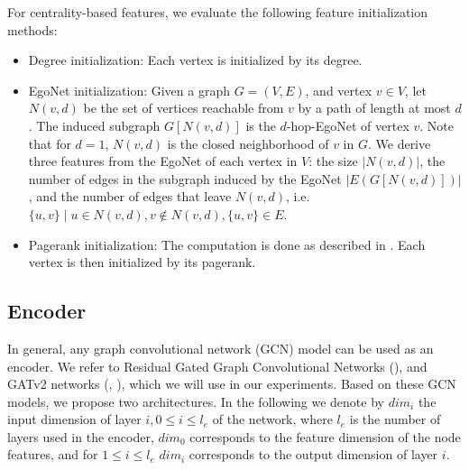 \documentclass[draft,final]{vutinfth} %
\begin{document}
For centrality-based features, we evaluate the following feature initialization methods: 
\begin{itemize}
    \item Degree initialization: Each vertex is initialized by its degree.
    \item EgoNet initialization: Given a graph $G = (V, E)$, and vertex $v \in V$, let $N(v, d)$ be the set of vertices reachable from $v$ by a path of length at most $d$. The induced subgraph $G[N(v, d)]$ is the $d$-hop-EgoNet of vertex $v$. Note that for $d=1$, $N(v, d)$ is the closed neighborhood of $v$ in $G$. We derive three features from the EgoNet of each vertex in $V$: the size $|N(v, d)|$, the number of edges in the subgraph induced by the EgoNet $|E(G[N(v, d)])|$, and the number of edges that leave $N(v, d)$, i.e. ${\{u, v\} \mid u \in N(v,d), v \notin N(v,d), \{u,v\} \in E}$.     
    \item Pagerank initialization: The computation is done as described in \cite{page1999pagerank}. Each vertex is then initialized by its pagerank.
\end{itemize}


\subsection{Encoder}
In general, any graph convolutional network (GCN) model can be used as an encoder. We refer to Residual Gated Graph Convolutional Networks (\cite{Bresson2017}), and GATv2 networks (\cite{Velickovic2018}, \cite{Brody2021}), which we will use in our experiments. Based on these GCN models, we propose two architectures. In the following we denote by $dim_i$ the input dimension of layer $i, 0 \leq i \leq l_e$ of the network, where $l_e$ is the number of layers used in the encoder, $dim_0$ corresponds to the feature dimension of the node features, and for $1 \leq i \leq l_e$ $dim_i$ corresponds to the output dimension of layer $i$. 
\end{document}
